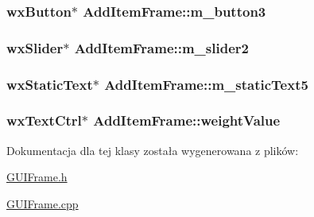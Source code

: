 \hypertarget{class_add_item_frame_a29e406c8fa85a1c85e0765d271c6517b}{
\subsubsection[{m\+\_\+button3}]{\setlength{\rightskip}{0pt plus 5cm}wx\+Button$\ast$ Add\+Item\+Frame\+::m\+\_\+button3\hspace{0.3cm}{\ttfamily [protected]}}}\label{class_add_item_frame_a29e406c8fa85a1c85e0765d271c6517b}
\hypertarget{class_add_item_frame_a840b2b66c739c9eb6d34234335435a3d}{
\subsubsection[{m\+\_\+slider2}]{\setlength{\rightskip}{0pt plus 5cm}wx\+Slider$\ast$ Add\+Item\+Frame\+::m\+\_\+slider2\hspace{0.3cm}{\ttfamily [protected]}}}\label{class_add_item_frame_a840b2b66c739c9eb6d34234335435a3d}
\hypertarget{class_add_item_frame_a772f2c686c3bf03a8d5ff1bfef9ccd81}{
\subsubsection[{m\+\_\+static\+Text5}]{\setlength{\rightskip}{0pt plus 5cm}wx\+Static\+Text$\ast$ Add\+Item\+Frame\+::m\+\_\+static\+Text5\hspace{0.3cm}{\ttfamily [protected]}}}\label{class_add_item_frame_a772f2c686c3bf03a8d5ff1bfef9ccd81}
\hypertarget{class_add_item_frame_a88e5bac41b035d903073637e97998d50}{
\subsubsection[{weight\+Value}]{\setlength{\rightskip}{0pt plus 5cm}wx\+Text\+Ctrl$\ast$ Add\+Item\+Frame\+::weight\+Value\hspace{0.3cm}{\ttfamily [protected]}}}\label{class_add_item_frame_a88e5bac41b035d903073637e97998d50}


Dokumentacja dla tej klasy została wygenerowana z plików\+:\begin{DoxyCompactItemize}
\item 
\hyperlink{_g_u_i_frame_8h}{G\+U\+I\+Frame.\+h}\item 
\hyperlink{_g_u_i_frame_8cpp}{G\+U\+I\+Frame.\+cpp}\end{DoxyCompactItemize}
